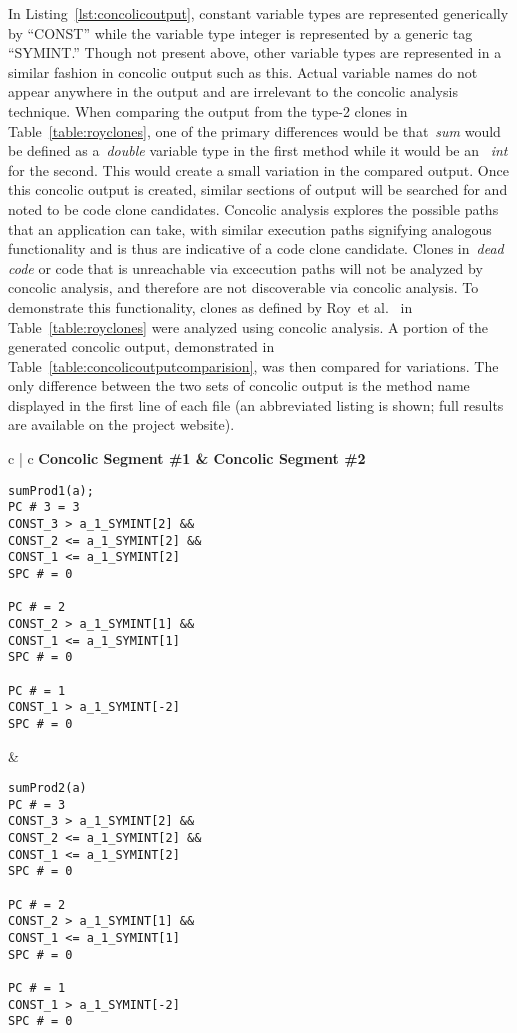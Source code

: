 \documentclass[smallextended]{svjour3}       %
\begin{document}
In Listing~\ref{lst:concolicoutput}, constant variable types are represented generically by ``CONST'' while the variable type integer is represented by a generic tag ``SYMINT.'' Though not present above, other variable types are represented in a similar fashion in concolic output such as this. Actual variable names do not appear anywhere in the output and are irrelevant to the concolic analysis technique. When comparing the output from the type-2 clones in Table~\ref{table:royclones}, one of the primary differences would be that~\emph{sum} would be defined as a~\emph{double} variable type in the first method while it would be an ~\emph{int} for the second. This would create a small variation in the compared output.
Once this concolic output is created, similar sections of output will be searched for and noted to be code clone candidates. Concolic analysis explores the possible paths that an application can take, with similar execution paths signifying analogous functionality and is thus are indicative of a code clone candidate. Clones in~\emph{dead code} or code that is unreachable via excecution paths will not be analyzed by concolic analysis, and therefore are not discoverable via concolic analysis. To demonstrate this functionality, clones as defined by Roy~et al.~\cite{Roy:2009:CEC:1530898.1531101} in Table~\ref{table:royclones} were analyzed using concolic analysis. A portion of the generated concolic output, demonstrated in Table~\ref{table:concolicoutputcomparision}, was then compared for variations. The only difference between the two sets of concolic output is the method name displayed in the first line of each file (an abbreviated listing is shown; full results are available on the project website).

\noindent
\begin{table*}
\centering
\begin{tabular}{c | c}
\bfseries Concolic Segment \#1  & \bfseries Concolic Segment \#2 \\ \hline \hline
\begin{lstlisting}
sumProd1(a);
PC # 3 = 3
CONST_3 > a_1_SYMINT[2] &&
CONST_2 <= a_1_SYMINT[2] &&
CONST_1 <= a_1_SYMINT[2]
SPC # = 0

PC # = 2
CONST_2 > a_1_SYMINT[1] &&
CONST_1 <= a_1_SYMINT[1]
SPC # = 0

PC # = 1
CONST_1 > a_1_SYMINT[-2]
SPC # = 0
\end{lstlisting}
&
\begin{lstlisting}
sumProd2(a)
PC # = 3
CONST_3 > a_1_SYMINT[2] &&
CONST_2 <= a_1_SYMINT[2] &&
CONST_1 <= a_1_SYMINT[2]
SPC # = 0

PC # = 2
CONST_2 > a_1_SYMINT[1] &&
CONST_1 <= a_1_SYMINT[1]
SPC # = 0

PC # = 1
CONST_1 > a_1_SYMINT[-2]
SPC # = 0
\end{lstlisting}

\end{tabular}
\caption{Diff of Concolic Output~\label{table:concolicoutputcomparision}}
\end{table*}
\end{document}
